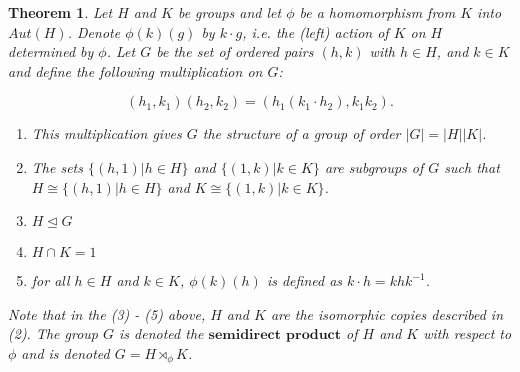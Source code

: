 \documentclass[11pt]{article}
\newtheorem{theorem}{Theorem}[section]
\newcommand{\ns}{\mathrel{\unlhd}}
\begin{document}
\begin{theorem}
Let $H$ and $K$ be groups and let $\phi$ be a homomorphism from $K$ into $Aut(H)$. Denote $\phi(k) (g)$ by $k\cdot g$, i.e. the (left) action of $K$ on $H$ determined by $\phi$. Let $G$ be the set of ordered pairs $(h,k)$ with $h \in H$, and $k \in K$ and define the following multiplication on $G$:

\begin{equation}
(h_1, k_1) (h_2, k_2) = (h_1 (k_1 \cdot h_2), k_1 k_2).
\end{equation}

\begin{enumerate}
\item This multiplication gives $G$ the structure of a group of order $| G | = |H| |K|$.
\item The sets $\{ (h,1) | h \in H\}$ and $\{ (1,k) | k \in K \}$ are subgroups of $G$ such that $H \cong \{ (h,1) | h \in H\}$ and $K \cong \{ (1,k) | k \in K \}$.
\item $H \ns G$
\item $H \cap K = 1$
\item for all $h \in H$ and $k\in K$, $\phi(k) (h)$ is defined as $k \cdot h = khk^{-1}$.
\end{enumerate}

Note that in the (3) - (5) above, $H$ and $K$ are the isomorphic copies described in (2). 
The group $G$ is denoted the $\mathbf{semidirect}$ $\mathbf{product}$ of $H$ and $K$ with respect to $\phi$ and is denoted $G = H \rtimes_{\phi} K$. 
\end{theorem}
\end{document}
